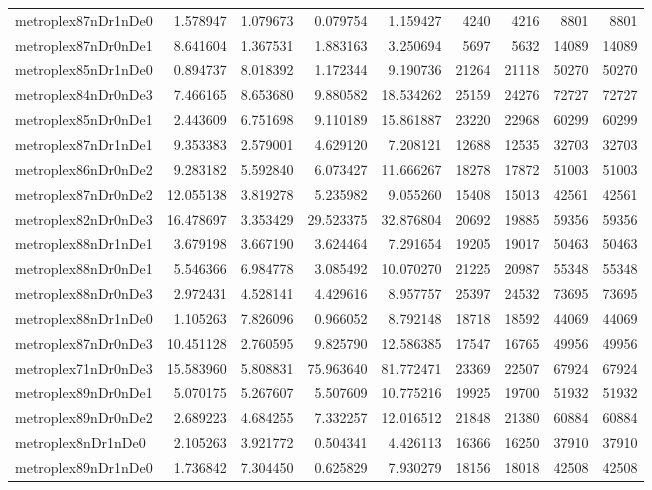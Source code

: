\begin{longtable}{|l|r|r|r|r|r|r|r|r|}
metroplex87nDr1nDe0 & 1.578947 & 1.079673 & 0.079754 & 1.159427 & 4240 & 4216 & 8801 & 8801 \\
metroplex87nDr0nDe1 & 8.641604 & 1.367531 & 1.883163 & 3.250694 & 5697 & 5632 & 14089 & 14089 \\
metroplex85nDr1nDe0 & 0.894737 & 8.018392 & 1.172344 & 9.190736 & 21264 & 21118 & 50270 & 50270 \\
metroplex84nDr0nDe3 & 7.466165 & 8.653680 & 9.880582 & 18.534262 & 25159 & 24276 & 72727 & 72727 \\
metroplex85nDr0nDe1 & 2.443609 & 6.751698 & 9.110189 & 15.861887 & 23220 & 22968 & 60299 & 60299 \\
metroplex87nDr1nDe1 & 9.353383 & 2.579001 & 4.629120 & 7.208121 & 12688 & 12535 & 32703 & 32703 \\
metroplex86nDr0nDe2 & 9.283182 & 5.592840 & 6.073427 & 11.666267 & 18278 & 17872 & 51003 & 51003 \\
metroplex87nDr0nDe2 & 12.055138 & 3.819278 & 5.235982 & 9.055260 & 15408 & 15013 & 42561 & 42561 \\
metroplex82nDr0nDe3 & 16.478697 & 3.353429 & 29.523375 & 32.876804 & 20692 & 19885 & 59356 & 59356 \\
metroplex88nDr1nDe1 & 3.679198 & 3.667190 & 3.624464 & 7.291654 & 19205 & 19017 & 50463 & 50463 \\
metroplex88nDr0nDe1 & 5.546366 & 6.984778 & 3.085492 & 10.070270 & 21225 & 20987 & 55348 & 55348 \\
metroplex88nDr0nDe3 & 2.972431 & 4.528141 & 4.429616 & 8.957757 & 25397 & 24532 & 73695 & 73695 \\
metroplex88nDr1nDe0 & 1.105263 & 7.826096 & 0.966052 & 8.792148 & 18718 & 18592 & 44069 & 44069 \\
metroplex87nDr0nDe3 & 10.451128 & 2.760595 & 9.825790 & 12.586385 & 17547 & 16765 & 49956 & 49956 \\
metroplex71nDr0nDe3 & 15.583960 & 5.808831 & 75.963640 & 81.772471 & 23369 & 22507 & 67924 & 67924 \\
metroplex89nDr0nDe1 & 5.070175 & 5.267607 & 5.507609 & 10.775216 & 19925 & 19700 & 51932 & 51932 \\
metroplex89nDr0nDe2 & 2.689223 & 4.684255 & 7.332257 & 12.016512 & 21848 & 21380 & 60884 & 60884 \\
metroplex8nDr1nDe0 & 2.105263 & 3.921772 & 0.504341 & 4.426113 & 16366 & 16250 & 37910 & 37910 \\
metroplex89nDr1nDe0 & 1.736842 & 7.304450 & 0.625829 & 7.930279 & 18156 & 18018 & 42508 & 42508 \\

\end{longtable}
